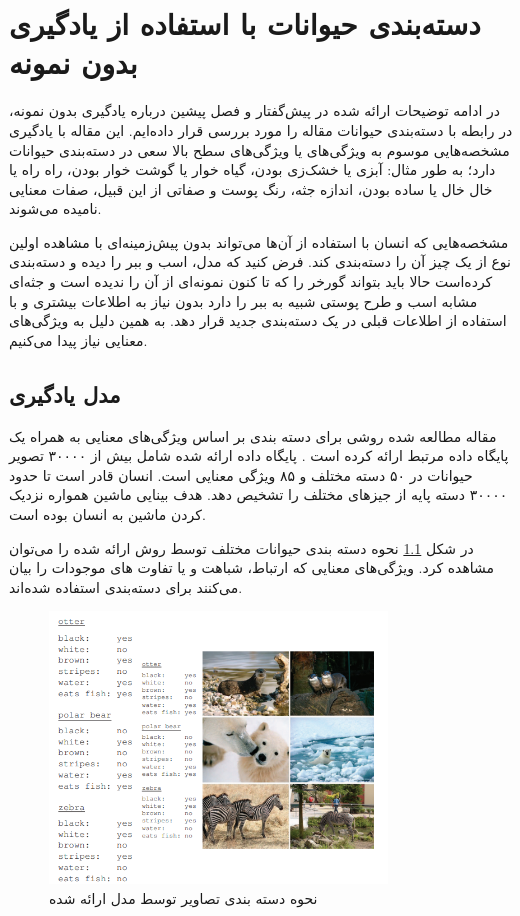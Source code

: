 \chapter{دسته‌بندی حیوانات با استفاده از یادگیری بدون نمونه}
\label{chap:one}
در ادامه توضیحات ارائه شده در پیش‌گفتار  و فصل پیشین درباره یادگیری بدون نمونه، در رابطه با دسته‌بندی حیوانات مقاله 
\cite{Lampert2014} 
را مورد بررسی قرار داده‌ایم. این مقاله با یادگیری مشخصه‌هایی موسوم به ویژگی‌های  
یا ویژگی‌های سطح بالا سعی در دسته‌بندی حیوانات دارد؛ به طور مثال: آبزی یا خشک‌زی بودن، گیاه خوار یا گوشت خوار بودن، راه راه یا خال خال یا ساده بودن، اندازه جثه، رنگ پوست و صفاتی از این قبیل، صفات معنایی نامیده می‌شوند. 

مشخصه‌هایی که انسان با استفاده از آن‌ها می‌تواند بدون پیش‌زمینه‌ای با مشاهده اولین نوع از یک چیز آن را دسته‌بندی کند. فرض کنید که مدل، اسب و ببر را دیده و دسته‌بندی کرده‌است حالا باید بتواند گورخر را که تا کنون نمونه‌ای از آن را ندیده است و جثه‌ای مشابه اسب و طرح پوستی شبیه به ببر را دارد بدون نیاز به اطلاعات بیشتری و با استفاده از اطلاعات قبلی در یک دسته‌بندی جدید قرار دهد. به همین دلیل به ویژگی‌های معنایی نیاز پیدا می‌کنیم.
\section{مدل یادگیری}
مقاله مطالعه شده روشی برای دسته بندی بر اساس ویژگی‌های معنایی به همراه یک پایگاه داده مرتبط ارائه کرده است
 \cite{Lampert2014}.
پایگاه داده ارائه شده شامل بیش از ۳۰۰۰۰ تصویر حیوانات در ۵۰ دسته مختلف و ۸۵ ویژگی معنایی است. انسان قادر است تا حدود ۳۰۰۰۰ دسته پایه از جیز‌های مختلف را تشخیص دهد. هدف بینایی ماشین همواره نزدیک کردن ماشین به انسان بوده است. 
 
در شکل
\ref{fig:sample}
نحوه دسته بندی حیوانات مختلف توسط روش ارائه شده را می‌توان مشاهده کرد. ویژگی‌های معنایی که ارتباط، شباهت و یا تفاوت های موجودات را بیان می‌کنند برای دسته‌بندی استفاده شده‌اند.
\begin{figure}
	\centering
	\includegraphics[width=0.8\textwidth]{img/report/sample}
	\caption{نحوه دسته بندی تصاویر توسط مدل ارائه شده \cite{Lampert2014}}
	\label{fig:sample}
	\centering
\end{figure}

